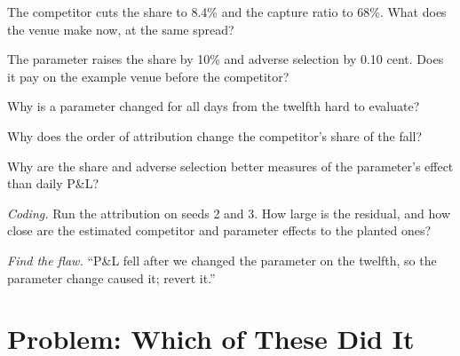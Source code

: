 \begin{exercise}[$\star$]\label{exo:hf:pnl-analytics-and-the-strategy-lifecycle:2}
The competitor cuts the share to 8.4\% and the capture ratio to 68\%. What does the venue make now, at the same spread?
\end{exercise}

\begin{exercise}[$\star$]\label{exo:hf:pnl-analytics-and-the-strategy-lifecycle:3}
The parameter raises the share by 10\% and adverse selection by 0.10 cent. Does it pay on the example venue before the competitor?
\end{exercise}

\begin{exercise}[$\star\star$]\label{exo:hf:pnl-analytics-and-the-strategy-lifecycle:4}
Why is a parameter changed for all days from the twelfth hard to evaluate?
\end{exercise}

\begin{exercise}[$\star\star$]\label{exo:hf:pnl-analytics-and-the-strategy-lifecycle:5}
Why does the order of attribution change the competitor's share of the fall?
\end{exercise}

\begin{exercise}[$\star\star$]\label{exo:hf:pnl-analytics-and-the-strategy-lifecycle:6}
Why are the share and adverse selection better measures of the parameter's effect than daily P\&L?
\end{exercise}

\begin{exercise}[$\star\star\star$]\label{exo:hf:pnl-analytics-and-the-strategy-lifecycle:7}
\emph{Coding.} Run the attribution on seeds 2 and 3. How large is the residual, and how close are the estimated competitor and parameter effects to
the planted ones?
\end{exercise}

\begin{exercise}[$\star\star\star$]\label{exo:hf:pnl-analytics-and-the-strategy-lifecycle:8}
\emph{Find the flaw.} ``P\&L fell after we changed the parameter on the twelfth, so the parameter change caused it; revert it.''
\end{exercise}

\section{Problem: Which of These Did It}

